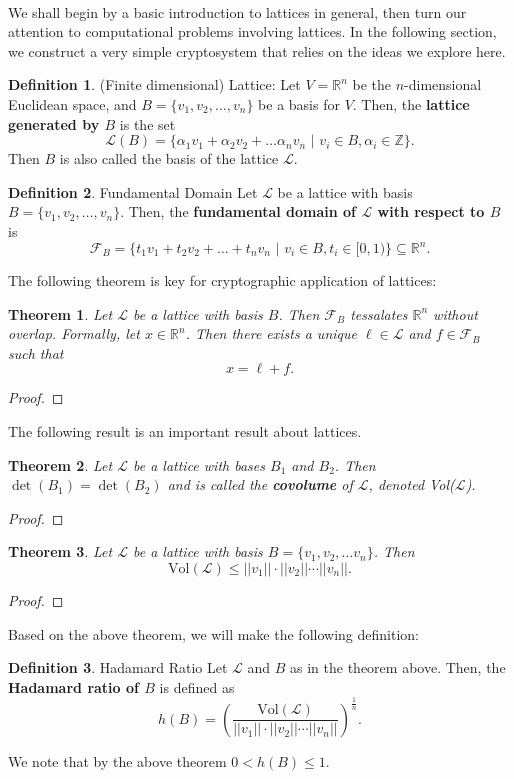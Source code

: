 \documentclass{article}
\newtheorem{theorem}{Theorem}[section]
\theoremstyle{definition}
\newtheorem{definition}{Definition}[section]
\renewcommand{\L}{\mathcal{L}}
\newcommand{\F}{\mathcal{F}}
\newcommand{\Int}{\mathbb{Z}}
\newcommand{\Reals}{\mathbb{R}}
\newcommand{\norm}[1]{||#1||}
\begin{document}
\paragraph{} We shall begin by a basic introduction to lattices in general, then
turn our attention to computational problems involving lattices. In the
following section, we construct a very simple cryptosystem that relies on the
ideas we explore here.
\begin{definition}{(Finite dimensional) Lattice:}
  Let $V = \Reals^n$ be the $n$-dimensional Euclidean space, and $B = \{v_1,
  v_2, \hdots, v_n\}$ be a basis for $V$. Then, the \textbf{lattice generated by $B$} is the set
  \[
    \L(B) = \{\alpha_1v_1 + \alpha_2v_2 + \hdots \alpha_nv_n\,\,|\,\, v_i \in B,
    \alpha_i \in \Int\}.
  \]
  Then $B$ is also called the basis of the lattice $\L$.
\end{definition}
\begin{definition}{Fundamental Domain}
  Let $\L$ be a lattice with basis $B = \{v_1, v_2, \hdots, v_n\}$. Then, the
  \textbf{fundamental domain of $\L$ with respect to $B$} is
  \[
    \F_B = \{t_1v_1 + t_2v_2 + \hdots + t_nv_n \,\,|\,\, v_i \in B, t_i \in [0,
    1)\} \subseteq \Reals^n.
  \]
\end{definition}
The following theorem is key for cryptographic application of lattices:
\begin{theorem}
  Let $\L$ be a lattice with basis $B$. Then $\F_B$ tessalates $\Reals^n$
  without overlap. Formally, let $x \in \Reals^n$. Then there exists a unique $\ell \in \L$
  and $f \in \F_B$ such that
\[
  x = \ell + f.
\]
\end{theorem}
\begin{proof}
\end{proof}
The following result is an important result about lattices.
\begin{theorem}
  Let $\L$ be a lattice with bases $B_1$ and $B_2$. Then $\det(B_1) = \det(B_2)$
  and is called the \textbf{covolume} of $\L$, denoted Vol($\L$).
\end{theorem}
\begin{proof}
\end{proof}
\begin{theorem}
  Let $\L$ be a lattice with basis $B = \{v_1, v_2, \hdots v_n\}$. Then
\[
  \text{Vol}(\L) \leq \norm{v_1}\cdot\norm{v_2}\cdots\norm{v_n}.
\]
\end{theorem}
\begin{proof}
\end{proof}
Based on the above theorem, we will make the following definition:
\begin{definition}{Hadamard Ratio}
  Let $\L$ and $B$ as in the theorem above. Then, the \textbf{Hadamard ratio of $B$}
  is defined as
  \[
    h(B) = \left( \frac{\text{Vol}(\L)}{\norm{v_1}\cdot\norm{v_2}\cdots\norm{v_n}} \right)^{\frac1n}.
  \]
\end{definition}
We note that by the above theorem $0 < h(B) \leq 1$.
\end{document}
